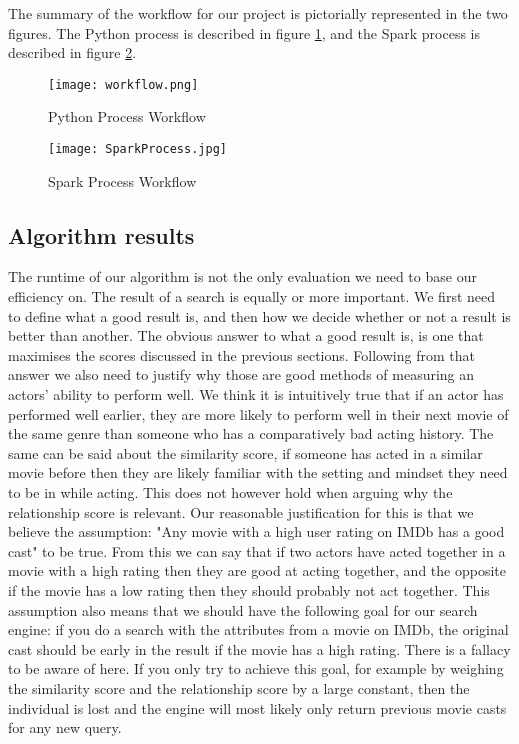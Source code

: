 The summary of the workflow for our project is pictorially represented in the two figures. The Python process is described in figure \ref{PythonWorkflow}, and the Spark process is described in figure \ref{SparkWorkflow}. 

\begin{figure}[h]
    \centering
    \texttt{[image: workflow.png]}
    \caption{Python Process Workflow}
    \label{PythonWorkflow}
\end{figure}

\begin{figure}[h]
    \centering
    \texttt{[image: SparkProcess.jpg]}
    \caption{Spark Process Workflow}
    \label{SparkWorkflow}
\end{figure}

\subsection{Algorithm results}

The runtime of our algorithm is not the only evaluation we need to base our efficiency on. The result of a search is equally or more important. We first need to define what a good result is, and then how we decide whether or not a result is better than another. The obvious answer to what a good result is, is one that maximises the scores discussed in the previous sections. Following from that answer we also need to justify why those are good methods of measuring an actors’ ability to perform well. We think it is intuitively true that if an actor has performed well earlier, they are more likely to perform well in their next movie of the same genre than someone who has a comparatively bad acting history. The same can be said about the similarity score, if someone has acted in a similar movie before then they are likely familiar with the setting and mindset they need to be in while acting. This does not however hold when arguing why the relationship score is relevant. Our reasonable justification for this is that we believe the assumption: "Any movie with a high user rating on IMDb has a good cast" to be true. From this we can say that if two actors have acted together in a movie with a high rating then they are good at acting together, and the opposite if the movie has a low rating then they should probably not act together. This assumption also means that we should have the following goal for our search engine: if you do a search with the attributes from a movie on IMDb, the original cast should be early in the result if the movie has a high rating. There is a fallacy to be aware of here. If you only try to achieve this goal, for example by weighing the similarity score and the relationship score by a large constant, then the individual is lost and the engine will most likely only return previous movie casts for any new query. 


